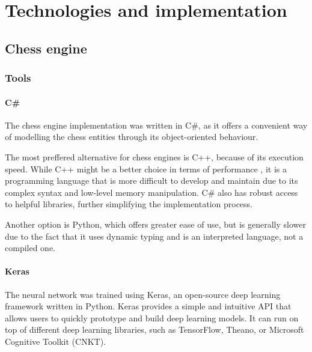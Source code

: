 \chapter{Technologies and implementation}
\label{chap:ch5}

\section{Chess engine}
\label{sec:ch5sec1}

\subsection{Tools}
\label{subsec:ch5sec1subsec1}

\subsubsection{C\#}
\label{subsubsec:ch5sec1subsec1subsubsec1}

The chess engine implementation was written in C\#, as it offers a convenient way of modelling the chess entities through its object-oriented behaviour.

The most preffered alternative for chess engines is C++, because of its execution speed. While C++ might be a better choice in terms of performance \cite{ogala2020comparative}, it is a programming language that is more difficult to develop and maintain due to its complex syntax and low-level memory manipulation. C\# also has robust access to helpful libraries, further simplifying the implementation process.

Another option is Python, which offers greater ease of use, but is generally slower due to the fact that it uses dynamic typing and is an interpreted language, not a compiled one.

\subsubsection{Keras}
\label{subsubsec:ch5sec1subsec1subsubsec2}

The neural network was trained using Keras, an open-source deep learning framework written in Python. Keras provides a simple and intuitive API that allows users to quickly prototype and build deep learning models. It can run on top of different deep learning libraries, such as TensorFlow, Theano, or Microsoft Cognitive Toolkit (CNKT).

